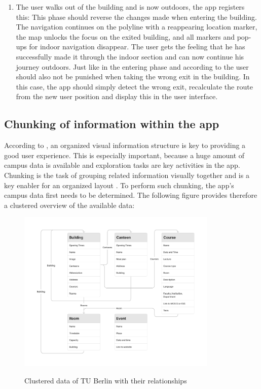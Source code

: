 \begin{enumerate}
    \item The user walks out of the building and is now outdoors, the app registers this: This phase should reverse the changes made when entering the building. The navigation continues on the polyline with a reappearing location marker, the map unlocks the focus on the exited building, and all markers and pop-ups for indoor navigation disappear. The user gets the feeling that he has successfully made it through the indoor section and can now continue his journey outdoors. Just like in the entering phase and according to \cite{postels_law} the user should also not be punished when taking the wrong exit in the building. In this case, the app should simply detect the wrong exit, recalculate the route from the new user position and display this in the user interface.
\end{enumerate}


\subsection{Chunking of information within the app}
According to \cite{millers_law}, an organized visual information structure is key to providing a good user experience. This is especially important, because a huge amount of campus data is available and exploration tasks are key activities in the app. Chunking is the task of grouping related information visually together and is a key enabler for an organized layout \cite{millers_law}. To perform such chunking, the app's campus data first needs to be determined. The following figure provides therefore a clustered overview of the available data:

\begin{figure}[H]
	\centering
	\includegraphics[width=0.85\textwidth]{images/information_cluster.png}\\
	\caption{Clustered data of TU Berlin with their relationships}
\end{figure}


